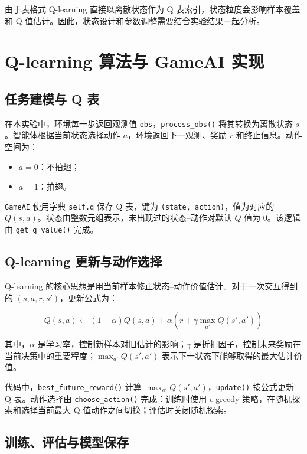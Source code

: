 \documentclass{zjureport}
\begin{document}
由于表格式 Q-learning 直接以离散状态作为 Q 表索引，状态粒度会影响样本覆盖和 Q 值估计。因此，状态设计和参数调整需要结合实验结果一起分析。

\clearpage

\section{Q-learning 算法与 GameAI 实现}

\subsection{任务建模与 Q 表}

在本实验中，环境每一步返回观测值 \texttt{obs}，\texttt{process\_obs()} 将其转换为离散状态 $s$。智能体根据当前状态选择动作 $a$，环境返回下一观测、奖励 $r$ 和终止信息。动作空间为：

\begin{itemize}
    \item $a=0$：不拍翅；
    \item $a=1$：拍翅。
\end{itemize}

\texttt{GameAI} 使用字典 \texttt{self.q} 保存 Q 表，键为 \texttt{(state, action)}，值为对应的 $Q(s,a)$。状态由整数元组表示，未出现过的状态--动作对默认 $Q$ 值为 0。该逻辑由 \texttt{get\_q\_value()} 完成。

\subsection{Q-learning 更新与动作选择}

Q-learning 的核心思想是用当前样本修正状态--动作价值估计。对于一次交互得到的 $(s,a,r,s')$，更新公式为：

\[
Q(s,a) \leftarrow (1-\alpha)Q(s,a)+\alpha \left(r+\gamma \max_{a'}Q(s',a')\right)
\]

其中，$\alpha$ 是学习率，控制新样本对旧估计的影响；$\gamma$ 是折扣因子，控制未来奖励在当前决策中的重要程度；$\max_{a'}Q(s',a')$ 表示下一状态下能够取得的最大估计价值。

代码中，\texttt{best\_future\_reward()} 计算 $\max_{a'}Q(s',a')$，\texttt{update()} 按公式更新 Q 表。动作选择由 \texttt{choose\_action()} 完成：训练时使用 $\epsilon$-greedy 策略，在随机探索和选择当前最大 Q 值动作之间切换；评估时关闭随机探索。

\subsection{训练、评估与模型保存}
\end{document}
